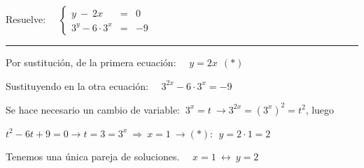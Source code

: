 \begin{miejercicio}

Resuelve: $\quad \left\{ \begin{array}{ccc} y\ -\ 2x&=&0 \\ 3^y-6\cdot 3^x&=&-9 \end{array} \right.$

\rule{250pt}{0.1pt}

\vspace{2mm} Por sustitución, de la primera ecuación: $\quad y=2x\ \ (*)$

\vspace{2mm} Sustituyendo en la otra ecuación: $\quad 3^{2x}-6\cdot 3^x=-9$

\vspace{2mm} Se hace necesario un cambio de variable: $\ 3^x=t \ \to 3^{2x}=(3^x)^2=t^2$, luego

\vspace{2mm} $t^2-6t+9=0 \to t=3=3^x \ \Rightarrow \ x=1 \ \to (*):\ \ y=2\cdot 1=2$

\vspace{2mm} Tenemos una única pareja de soluciones. $\quad x=1 \ \leftrightarrow \ y=2$
	
\end{miejercicio}


